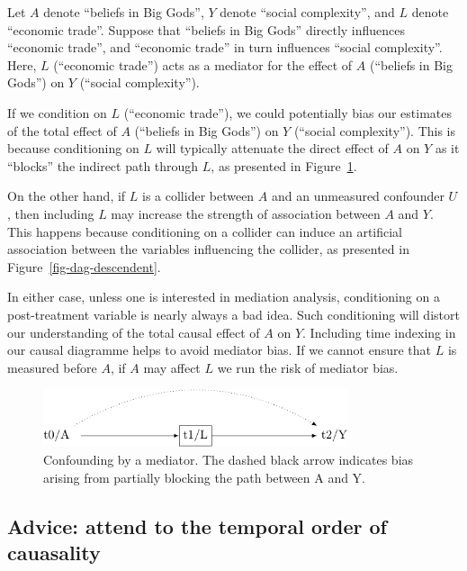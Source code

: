 \documentclass[
  singlecolumn]{report}
\begin{document}
Let \(A\) denote ``beliefs in Big Gods'', \(Y\) denote ``social
complexity'', and \(L\) denote ``economic trade''. Suppose that
``beliefs in Big Gods'' directly influences ``economic trade'', and
``economic trade'' in turn influences ``social complexity''. Here, \(L\)
(``economic trade'') acts as a mediator for the effect of \(A\)
(``beliefs in Big Gods'') on \(Y\) (``social complexity'').

If we condition on \(L\) (``economic trade''), we could potentially bias
our estimates of the total effect of \(A\) (``beliefs in Big Gods'') on
\(Y\) (``social complexity''). This is because conditioning on \(L\)
will typically attenuate the direct effect of \(A\) on \(Y\) as it
``blocks'' the indirect path through \(L\), as presented in
Figure~\ref{fig-dag-mediator}.

On the other hand, if \(L\) is a collider between \(A\) and an
unmeasured confounder \(U\), then including \(L\) may increase the
strength of association between \(A\) and \(Y\). This happens because
conditioning on a collider can induce an artificial association between
the variables influencing the collider, as presented in
Figure~\ref{fig-dag-descendent}.

In either case, unless one is interested in mediation analysis,
conditioning on a post-treatment variable is nearly always a bad idea.
Such conditioning will distort our understanding of the total causal
effect of \(A\) on \(Y\). Including time indexing in our causal
diagramme helps to avoid mediator bias. If we cannot ensure that \(L\)
is measured before \(A\), if \(A\) may affect \(L\) we run the risk of
mediator bias.

\begin{figure}

{\centering \includegraphics[width=0.8\textwidth,height=\textheight]{causal-dags_files/figure-pdf/fig-dag-mediator-1.pdf}

}

\caption{\label{fig-dag-mediator}Confounding by a mediator. The dashed
black arrow indicates bias arising from partially blocking the path
between A and Y.}

\end{figure}

\hypertarget{advice-attend-to-the-temporal-order-of-cauasality-2}{%
\subsection{Advice: attend to the temporal order of
cauasality}\label{advice-attend-to-the-temporal-order-of-cauasality-2}}
\end{document}
